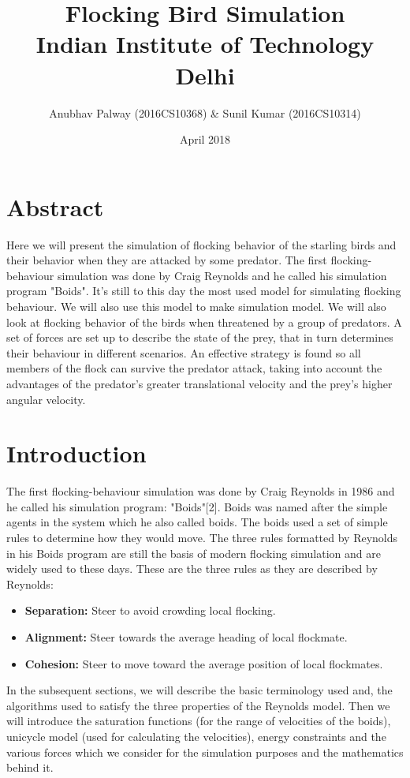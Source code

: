 \documentclass[12pt]{article}
\title{Flocking Bird Simulation\\
\large Indian Institute of Technology Delhi}
\author{Anubhav Palway (2016CS10368) \& Sunil Kumar (2016CS10314) }
\date{April 2018}
\begin{document}
\tableofcontents

\maketitle

\section{Abstract}
Here we will present the simulation of flocking behavior of the starling birds and their behavior when they are attacked by some predator. The first flocking-behaviour simulation was done by Craig Reynolds and he called his simulation program "Boids". It's still to this day the most used model for simulating flocking behaviour. We will also use this model to make simulation model. We will also look at flocking behavior of the birds when threatened by a group of predators. A set of forces are set up to describe the state of the prey, that in turn determines their behaviour in different scenarios. An effective strategy is found so all members of the flock can survive the predator attack, taking into account the advantages of the predator’s greater translational velocity and the prey’s higher angular velocity.

\section{Introduction}
The first flocking-behaviour simulation was done by Craig Reynolds in 1986 and he called his simulation program: "Boids"[2]. Boids was named after the simple agents in the system which he also called boids. The boids used a set of simple rules to determine how they would move. The three rules formatted by Reynolds in his Boids program are still the basis of modern flocking simulation and are widely used to these days. These are the three rules as they are described by Reynolds:\\
\begin{itemize}
    \item \textbf{Separation: } Steer to avoid crowding local flocking.
    \item \textbf{Alignment: } Steer towards the average heading of local flockmate.
    \item \textbf{Cohesion: } Steer to move toward the average position of local flockmates.
    
\end{itemize}

\bigbreak
In the subsequent sections, we will describe the basic terminology used and, the algorithms used to satisfy the three properties of the Reynolds model. Then we will introduce the saturation functions (for the range of velocities of the boids), unicycle model (used for calculating the velocities), energy constraints and the various forces which we consider for the simulation purposes and the mathematics behind it.
\end{document}
